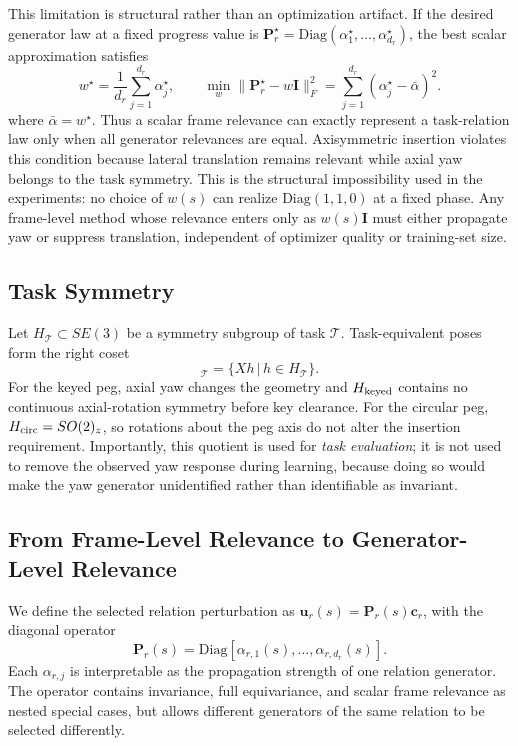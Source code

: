\documentclass[letterpaper,10pt,conference]{ieeeconf}
\begin{document}
This limitation is structural rather than an optimization artifact. If the
desired generator law at a fixed progress value is
$\mathbf P_r^\star=\mathrm{Diag}(\alpha_1^\star,\ldots,\alpha_{d_r}^\star)$,
the best scalar approximation satisfies
\begin{equation}
    w^\star=\frac{1}{d_r}\sum_{j=1}^{d_r}\alpha_j^\star,\qquad
    \min_w\|\mathbf P_r^\star-w\mathbf I\|_F^2
    =
    \sum_{j=1}^{d_r}(\alpha_j^\star-\bar\alpha)^2 .
    \label{eq:best_scalar}
\end{equation}
where $\bar\alpha=w^\star$.
Thus a scalar frame relevance can exactly represent a task-relation law only
when all generator relevances are equal. Axisymmetric insertion violates this
condition because lateral translation remains relevant while axial yaw belongs
to the task symmetry.
This is the structural impossibility used in the experiments: no choice of
$w(s)$ can realize $\mathrm{Diag}(1,1,0)$ at a fixed phase. Any frame-level
method whose relevance enters only as $w(s)\mathbf I$ must either propagate yaw
or suppress translation, independent of optimizer quality or training-set size.

\subsection{Task Symmetry}

Let $H_{\mathcal T}\subset SE(3)$ be a symmetry subgroup of task $\mathcal T$.
Task-equivalent poses form the right coset
\begin{equation}
    [X]_{\mathcal T}=\{Xh\,|\,h\in H_{\mathcal T}\}.
\end{equation}
For the keyed peg, axial yaw changes the geometry and
$H_{\rm keyed}$ contains no continuous axial-rotation symmetry before key
clearance. For the circular
peg, $H_{\rm circ}=SO(2)_z$, so rotations about the peg axis do not alter the
insertion requirement.
Importantly, this quotient is used for \emph{task evaluation}; it is not used
to remove the observed yaw response during learning, because doing so would
make the yaw generator unidentified rather than identifiable as invariant.

\subsection{From Frame-Level Relevance to Generator-Level Relevance}
\label{sec:generator_relevance}

We define the selected relation perturbation as
$\bm u_r(s)=\mathbf P_r(s)\bm c_r$, with the diagonal operator
\begin{equation}
    \boxed{
    \mathbf P_r(s)=
    \mathrm{Diag}\!\left[
    \alpha_{r,1}(s),\ldots,\alpha_{r,d_r}(s)
    \right].
    }
    \label{eq:pdiag}
\end{equation}
Each $\alpha_{r,j}$ is interpretable as the propagation strength of one
relation generator. The operator contains invariance, full equivariance, and
scalar frame relevance as nested special cases, but allows different generators
of the same relation to be selected differently.
\end{document}
